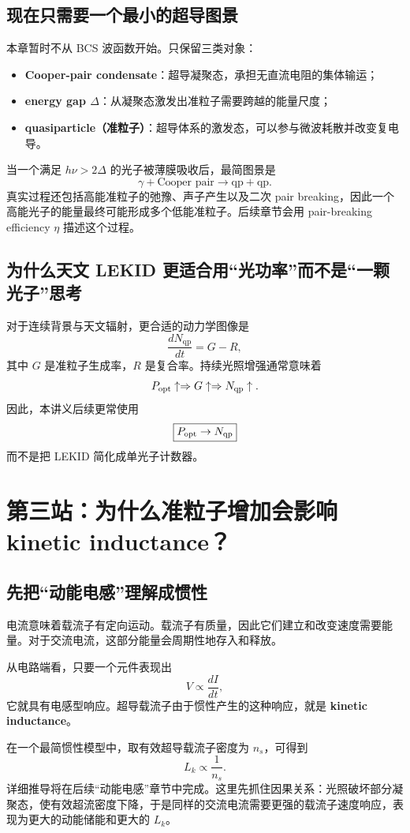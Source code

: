 \documentclass[11pt,a4paper,openany]{ctexrep}
\newcommand{\qp}{\mathrm{qp}}
\begin{document}
\subsection{现在只需要一个最小的超导图景}
本章暂时不从 BCS 波函数开始。只保留三类对象：
\begin{itemize}
  \item \textbf{Cooper-pair condensate}：超导凝聚态，承担无直流电阻的集体输运；
  \item \textbf{energy gap $\Delta$}：从凝聚态激发出准粒子需要跨越的能量尺度；
  \item \textbf{quasiparticle（准粒子）}：超导体系的激发态，可以参与微波耗散并改变复电导。
\end{itemize}

当一个满足 $h\nu>2\Delta$ 的光子被薄膜吸收后，最简图景是
\[
\gamma + \text{Cooper pair}\rightarrow \qp+\qp.
\]
真实过程还包括高能准粒子的弛豫、声子产生以及二次 pair breaking，因此一个高能光子的能量最终可能形成多个低能准粒子。后续章节会用 pair-breaking efficiency $\eta$ 描述这个过程。

\subsection{为什么天文 LEKID 更适合用“光功率”而不是“一颗光子”思考}
对于连续背景与天文辐射，更合适的动力学图像是
\[
\frac{dN_{\qp}}{dt}=G-R,
\]
其中 $G$ 是准粒子生成率，$R$ 是复合率。持续光照增强通常意味着
\[
P_{\rm opt}\uparrow \Rightarrow G\uparrow \Rightarrow N_{\qp}\uparrow.
\]
因此，本讲义后续更常使用
\[
\boxed{P_{\rm opt}\rightarrow N_{\qp}}
\]
而不是把 LEKID 简化成单光子计数器。

\section{第三站：为什么准粒子增加会影响 kinetic inductance？}

\subsection{先把“动能电感”理解成惯性}
电流意味着载流子有定向运动。载流子有质量，因此它们建立和改变速度需要能量。对于交流电流，这部分能量会周期性地存入和释放。

从电路端看，只要一个元件表现出
\[
V\propto\frac{dI}{dt},
\]
它就具有电感型响应。超导载流子由于惯性产生的这种响应，就是 \textbf{kinetic inductance}。

在一个最简惯性模型中，取有效超导载流子密度为 $n_s$，可得到
\[
L_k\propto\frac{1}{n_s}.
\]
详细推导将在后续“动能电感”章节中完成。这里先抓住因果关系：光照破坏部分凝聚态，使有效超流密度下降，于是同样的交流电流需要更强的载流子速度响应，表现为更大的动能储能和更大的 $L_k$。
\end{document}
